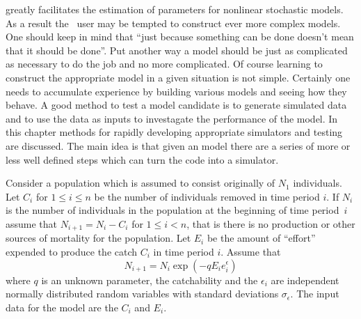 %
%
\def\kerntwo{\kern -4pt}


\ADMS greatly facilitates the estimation of parameters for
nonlinear stochastic models. As a result the \ADM\ user may
be tempted to construct ever more complex models. One should keep
in mind that ``just because something can be done doesn't mean
that it should be done''. Put another way a model should be
just as complicated as necessary to do the job and no
more complicated. Of course learning to construct the 
appropriate model in a given situation is not simple. 
Certainly one needs to accumulate experience by building
various models and seeing how they behave. A good method to
test a model candidate is to generate simulated data 
and to use the data as inputs to investagate the performance
of the model. In this chapter methods for rapidly developing
appropriate simulators and testing are discussed. The main idea
is that given an \ADMS model there are a series of more or less
well defined steps which can turn the code into a simulator. 




Consider a population which is assumed to consist originally of
$N_1$ individuals. Let $C_i$ for $1\le i\le n$ be the number of
individuals removed in time period $i$. If $N_i$ is the number
of individuals in the population at the beginning of time period~$i$
assume that $N_{i+1}=N_i-C_i$ for $1\le i< n$, that is there is
no production or other sources of mortality for the
population. Let $E_i$ be the amount of ``effort'' expended
to produce the catch $C_i$ in time period $i$. Assume that
$$N_{i+1}=N_i\exp(-qE_ie^\epsilon_i)$$ 
where $q$ is an
unknown parameter, the catchability and the $\epsilon_i$
are independent normally distributed random variables with
standard deviations $\sigma_\epsilon$.
The input data for the model are the $C_i$ and $E_i$.


